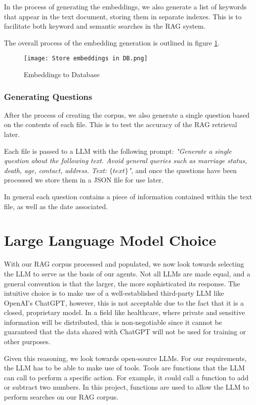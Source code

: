 In the process of generating the embeddings, we also generate a list of keywords that appear in the text document, storing them in separate indexes. This is to facilitate both keyword and semantic searches in the RAG system.

The overall process of the embedding generation is outlined in figure \ref{fig:EmbeddingsDatabase}.

\begin{figure}
	\texttt{[image: Store embeddings in DB.png]}
	\caption{Embeddings to Database}
	\centering
	\label{fig:EmbeddingsDatabase}
\end{figure}

\subsubsection{Generating Questions}

After the process of creating the corpus, we also generate a single question based on the contents of each file. This is to test the accuracy of the RAG retrieval later.

Each file is passed to a LLM with the following prompt: \textit{"Generate a single question about the following text. Avoid general queries such as marriage status, death, age, contact, address. Text: $\{text\}$"}, and once the questions have been processed we store them in a JSON file for use later.

In general each question contains a piece of information contained within the text file, as well as the date associated.
\section{Large Language Model Choice}

With our RAG corpus processed and populated, we now look towards selecting the LLM to serve as the basis of our agents.
Not all LLMs are made equal, and a general convention is that the larger, the more sophisticated its response.
The intuitive choice is to make use of a well-established third-party LLM like OpenAI's ChatGPT, however, this is not acceptable due to the fact that it is a closed, proprietary model. In a field like healthcare, where private and sensitive information will be distributed, this is non-negotiable since it cannot be guaranteed that the data shared with ChatGPT will not be used for training or other purposes.

Given this reasoning, we look towards open-source LLMs. For our requirements, the LLM has to be able to make use of tools. Tools are functions that the LLM can call to perform a specific action. For example, it could call a function to add or subtract two numbers. In this project, functions are used to allow the LLM to perform searches on our RAG corpus.

